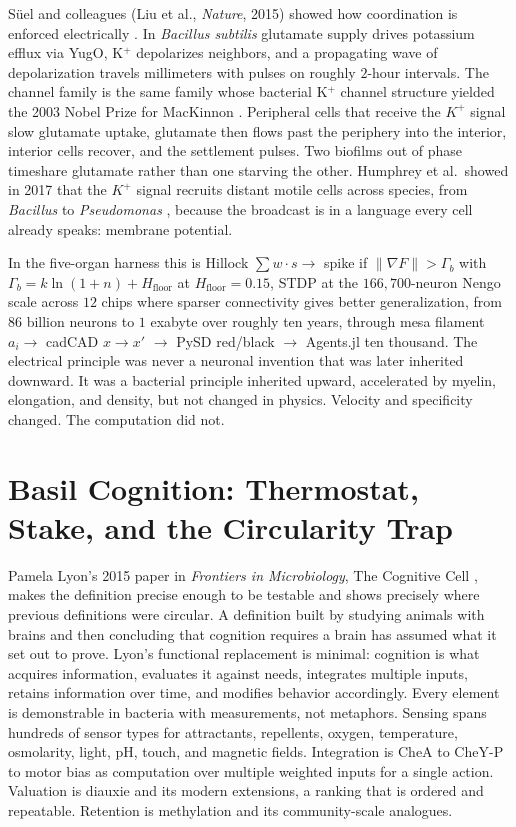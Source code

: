 \documentclass[12pt,a4paper]{article}
\begin{document}
S\"{u}el and colleagues (Liu et al., \emph{Nature}, 2015) showed how coordination is enforced electrically \cite{liu2015,prindle2015}. In \emph{Bacillus subtilis} glutamate supply drives potassium efflux via YugO, K$^+$ depolarizes neighbors, and a propagating wave of depolarization travels millimeters with pulses on roughly $2$-hour intervals. The channel family is the same family whose bacterial K$^+$ channel structure yielded the 2003 Nobel Prize for MacKinnon \cite{mackinnon2003}. Peripheral cells that receive the $K^+$ signal slow glutamate uptake, glutamate then flows past the periphery into the interior, interior cells recover, and the settlement pulses. Two biofilms out of phase timeshare glutamate rather than one starving the other. Humphrey et al.\ showed in 2017 that the $K^+$ signal recruits distant motile cells across species, from \emph{Bacillus} to \emph{Pseudomonas} \cite{humphries2017}, because the broadcast is in a language every cell already speaks: membrane potential.

In the five-organ harness this is Hillock $\sum w \cdot s \to$ spike if $\lVert \nabla F \rVert > \Gamma_b$ with $\Gamma_b = k\ln(1+n)+H_{\mathrm{floor}}$ at $H_{\mathrm{floor}}=0.15$, STDP at the $166{,}700$-neuron Nengo scale across $12$ chips where sparser connectivity gives better generalization, from $86$ billion neurons to $1$ exabyte over roughly ten years, through mesa filament $a_i \to$ cadCAD $x \to x'$ $\to$ PySD red/black $\to$ Agents.jl ten thousand. The electrical principle was never a neuronal invention that was later inherited downward. It was a bacterial principle inherited upward, accelerated by myelin, elongation, and density, but not changed in physics. Velocity and specificity changed. The computation did not.

\section{Basil Cognition: Thermostat, Stake, and the Circularity Trap}
\label{sec:basil}

Pamela Lyon's 2015 paper in \emph{Frontiers in Microbiology}, The Cognitive Cell \cite{lyon2015}, makes the definition precise enough to be testable and shows precisely where previous definitions were circular. A definition built by studying animals with brains and then concluding that cognition requires a brain has assumed what it set out to prove. Lyon's functional replacement is minimal: cognition is what acquires information, evaluates it against needs, integrates multiple inputs, retains information over time, and modifies behavior accordingly. Every element is demonstrable in bacteria with measurements, not metaphors. Sensing spans hundreds of sensor types for attractants, repellents, oxygen, temperature, osmolarity, light, pH, touch, and magnetic fields. Integration is CheA to CheY-P to motor bias as computation over multiple weighted inputs for a single action. Valuation is diauxie and its modern extensions, a ranking that is ordered and repeatable. Retention is methylation and its community-scale analogues.
\end{document}
